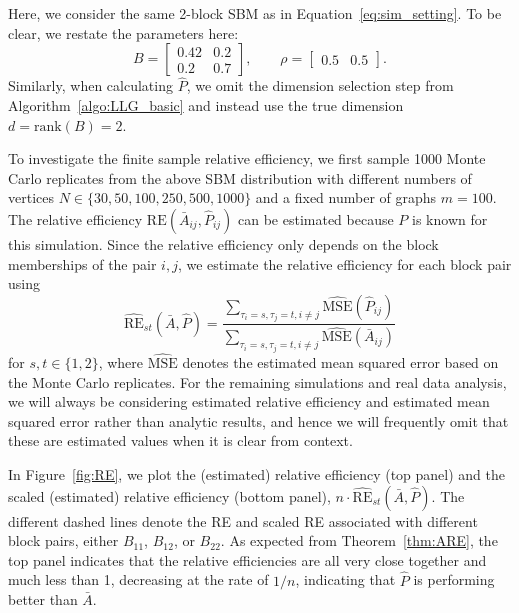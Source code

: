 Here, we consider the same 2-block SBM as in Equation~\ref{eq:sim_setting}. To be clear, we restate the parameters here:
\begin{equation*}
B = \begin{bmatrix}
0.42 & 0.2 \\
0.2 & 0.7
\end{bmatrix}
,\qquad \rho = \begin{bmatrix}
0.5 & 0.5
\end{bmatrix}.
\end{equation*}
Similarly, when calculating $\hat{P}$, we omit the dimension selection step from Algorithm~\ref{algo:LLG_basic} and instead use the true dimension $d = \mathrm{rank}(B) = 2$.

To investigate the finite sample relative efficiency, we first sample 1000 Monte Carlo replicates from the above SBM distribution with different numbers of vertices $N \in \{30, 50, 100, 250, 500, 1000 \}$ and a fixed number of graphs $m = 100$. The relative efficiency $\mathrm{RE}(\bar{A}_{ij}, \hat{P}_{ij})$ can be estimated because $P$ is known for this simulation. Since the relative efficiency only depends on the block memberships of the pair $i,j$, we estimate the relative efficiency for each block pair using
\[
    \hat{\mathrm{RE}}_{st}(\bar{A},\hat{P}) = \frac{\sum_{\tau_i=s,\tau_j=t,i \ne j} \hat{\mathrm{MSE}}(\hat{P}_{ij})}{\sum_{\tau_i=s,\tau_j=t,i \ne j} \hat{\mathrm{MSE}}(\bar{A}_{ij})}
\]
for $s,t\in\{1,2\}$, where $\hat{\mathrm{MSE}}$ denotes the estimated mean squared error based on the Monte Carlo replicates.
For the remaining simulations and real data analysis, we will always be considering estimated relative efficiency and estimated mean squared error rather than analytic results, and hence we will frequently omit that these are estimated values when it is clear from context.

In Figure~\ref{fig:RE}, we plot the (estimated) relative efficiency (top panel) and the scaled (estimated) relative efficiency (bottom panel), $n \cdot \hat{\mathrm{RE}}_{st}(\bar{A},\hat{P})$.
The different dashed lines denote the RE and scaled RE associated with different block pairs, either $B_{11}$, $B_{12}$, or $B_{22}$. 
As expected from Theorem~\ref{thm:ARE}, the top panel indicates that the relative efficiencies are all very close together and much less than 1, decreasing at the rate of $1/n$, indicating that $\hat{P}$ is performing better than $\bar{A}$.

